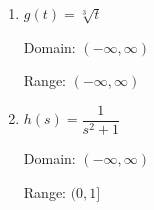 \documentclass{ximera}
\begin{document}
\begin{enumerate}
\item 

$g(t) = \sqrt[3]{t}$ 

Domain: $(-\infty, \infty)$ 

Range:  $(-\infty, \infty)$

 




\item  

$h(s) = \dfrac{1}{s^{2} + 1}$ 

Domain: $(-\infty, \infty)$ 

Range:  $(0, 1]$

 





\end{enumerate}
\end{document}
